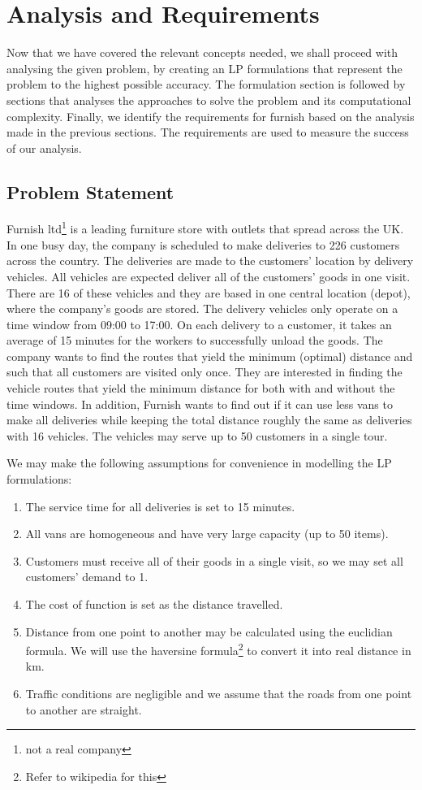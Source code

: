 \chapter{Analysis and Requirements}
Now that we have covered the relevant concepts needed, we shall proceed with
analysing the given problem, by creating an LP formulations that represent the problem to the highest possible accuracy.
The formulation section is followed by sections that analyses the approaches to solve the problem and its computational
complexity. Finally, we identify the requirements for furnish based on the analysis made in the previous sections. The
requirements are used to measure the success of our analysis.

\section{Problem Statement}
Furnish ltd\footnote{not a real company} is a leading furniture store with outlets that spread across the UK. In one busy day, the company is scheduled to
make deliveries to 226 customers across the country. The deliveries are made to the customers' location by delivery vehicles. All vehicles are
expected deliver all of the customers' goods in one visit.  There are 16 of these vehicles and they are based in
one central location (depot), where the company's goods are stored. The delivery vehicles only operate on
a time window from 09:00 to 17:00. On each delivery to a customer, it takes an average of 15 minutes for the workers to successfully unload the goods.
The company wants to find the routes that yield the minimum (optimal) distance and such that all customers are visited only once. They are interested
in finding the vehicle routes that yield the minimum distance for both with and without the time windows.
In addition, Furnish wants to find out if it can use less vans to make all deliveries while
keeping the total distance roughly the same as deliveries with 16 vehicles. The vehicles may serve up to 50 customers in a single tour.

We may make the following assumptions for convenience in modelling the LP formulations:
\begin{enumerate}
\item The service time for all deliveries is set to 15 minutes.
\item All vans are homogeneous and have very large capacity (up to 50 items).
\item Customers must receive all of their goods in a single visit, so we may set all customers' demand to 1.
\item The cost of function is set as the distance travelled.
\item Distance from one point to another may be calculated using the euclidian formula. We will use the haversine
formula\footnote{Refer to wikipedia for this} to convert it into real distance in km.
\item Traffic conditions are negligible and we assume that the roads from one point to another are straight.
\end{enumerate}

